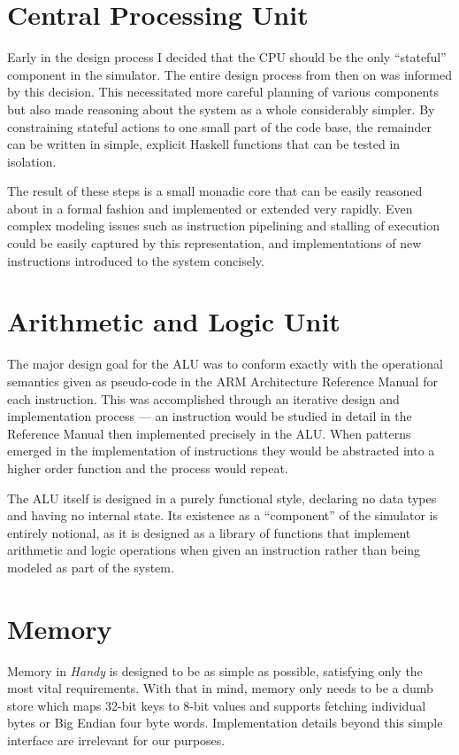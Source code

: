 \section{Central Processing Unit}

Early in the design process I decided that the CPU should be the only ``stateful'' component in the simulator. The entire design process from then on was informed by this decision. This necessitated more careful planning of various components but also made reasoning about the system as a whole considerably simpler. By constraining stateful actions to one small part of the code base, the remainder can be written in simple, explicit Haskell functions that can be tested in isolation.

The result of these steps is a small monadic core that can be easily reasoned about in a formal fashion and implemented or extended very rapidly. Even complex modeling issues such as instruction pipelining and stalling of execution could be easily captured by this representation, and implementations of new instructions introduced to the system concisely.

\section{Arithmetic and Logic Unit}

The major design goal for the ALU was to conform exactly with the operational semantics given as pseudo-code in the ARM Architecture Reference Manual for each instruction. This was accomplished through an iterative design and implementation process --- an instruction would be studied in detail in the Reference Manual then implemented precisely in the ALU. When patterns emerged in the implementation of instructions they would be abstracted into a higher order function and the process would repeat.

The ALU itself is designed in a purely functional style, declaring no data types and having no internal state. Its existence as a ``component'' of the simulator is entirely notional, as it is designed as a library of functions that implement arithmetic and logic operations when given an instruction rather than being modeled as part of the system.

\section{Memory}
\label{sec:design:memory}

Memory in \emph{Handy} is designed to be as simple as possible, satisfying only the most vital requirements. With that in mind, memory only needs to be a dumb store which maps 32-bit keys to 8-bit values and supports fetching individual bytes or Big Endian four byte words. Implementation details beyond this simple interface are irrelevant for our purposes.

